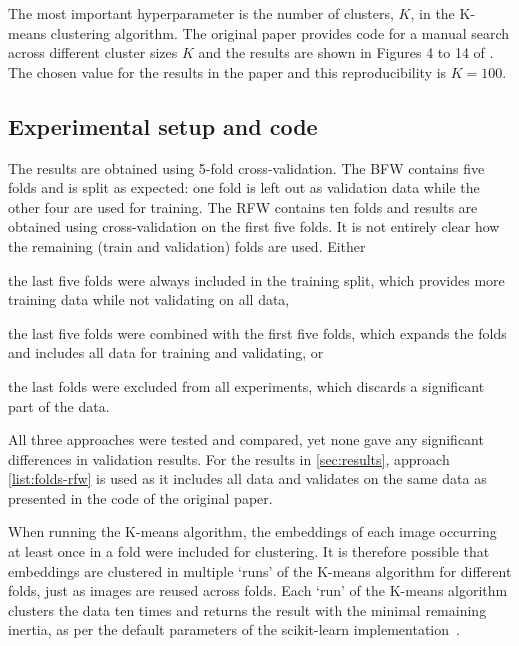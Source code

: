The most important hyperparameter is the number of clusters, \textbf{$K$}, in the K-means clustering algorithm.
The original paper provides code for a manual search across different cluster sizes $K$ and the results are shown in Figures 4 to 14 of \cite{salvador2022faircal}.
The chosen value for the results in the paper and this reproducibility is $K=100$.

\subsection{Experimental setup and code}  %

The results are obtained using 5-fold cross-validation.
The BFW contains five folds and is split as expected: one fold is left out as validation data while the other four are used for training.
The RFW contains ten folds and results are obtained using cross-validation on the first five folds.
It is not entirely clear how the remaining (train and validation) folds are used.
Either 
\begin{enumerate*}[label=(\roman*)]
    \item\label{list:folds-rfw} the last five folds were always included in the training split, which provides more training data while not validating on all data,%
    \item the last five folds were combined with the first five folds, which expands the folds and includes all data for training and validating, or%
    \item the last folds were excluded from all experiments, which discards a significant part of the data.
\end{enumerate*}
All three approaches were tested and compared, yet none gave any significant differences in validation results.
For the results in \autoref{sec:results}, approach \ref{list:folds-rfw} is used as it includes all data and validates on the same data as presented in the code of the original paper.

When running the K-means algorithm, the embeddings %
of each image occurring at least once in
a fold were included for clustering.
It is therefore possible that embeddings are clustered in multiple `runs' of the K-means algorithm for different folds, just as images are reused across folds.
Each `run' of the K-means algorithm clusters the data ten times and returns the result with the minimal remaining inertia, as per the default parameters of the scikit-learn implementation~\cite{scikit-learn}.

